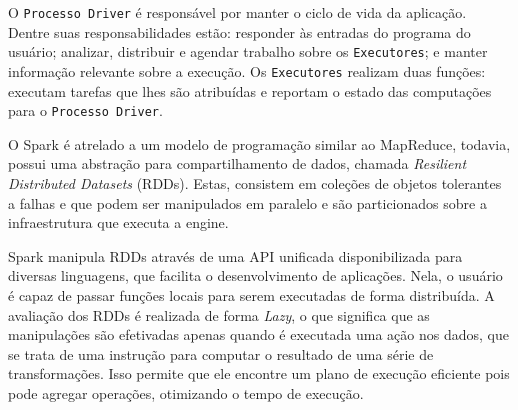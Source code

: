 O \texttt{Processo Driver} é responsável por manter o ciclo de vida da 
aplicação. Dentre suas responsabilidades estão: responder às entradas do 
programa do usuário; analizar, distribuir e agendar trabalho sobre os 
\texttt{Executores}; e manter informação relevante sobre a execução. Os 
\texttt{Executores} realizam duas funções: executam tarefas que lhes são 
atribuídas e reportam o estado das computações para o \texttt{Processo 
Driver}.

O Spark é atrelado a um modelo de programação similar ao MapReduce, todavia, 
possui uma abstração para compartilhamento de dados, chamada \emph{Resilient 
Distributed Datasets} (RDDs). Estas, consistem em coleções de objetos tolerantes 
a falhas e que podem ser manipulados em paralelo e são particionados sobre a 
infraestrutura que executa a engine. 

Spark manipula RDDs através de uma API unificada disponibilizada para diversas 
linguagens, que facilita o desenvolvimento de aplicações. Nela, o usuário é 
capaz de passar funções locais para serem executadas de forma distribuída. A 
avaliação dos RDDs é realizada de forma \emph{Lazy}, o que significa que as 
manipulações são efetivadas apenas quando é executada uma ação nos dados, que 
se trata de uma instrução para computar o resultado de uma série de 
transformações. Isso permite que ele encontre um plano de execução eficiente 
pois pode agregar operações, otimizando o tempo de execução.






